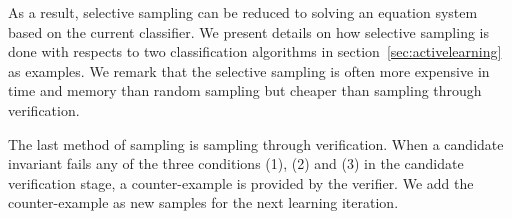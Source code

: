 As a result, selective sampling can be reduced to solving an equation system based on the current classifier. 
We present details on how selective sampling is done with respects to two classification algorithms in section~\ref{sec:activelearning} as examples. 
We remark that the selective sampling is often more expensive in time and memory than random sampling but cheaper than sampling through verification.


The last method of sampling is sampling through verification. 
When a candidate invariant fails any of the three conditions (1), (2) and (3) in the candidate verification stage,
a counter-example is provided by the verifier. 
We add the counter-example as new samples for the next learning iteration. 

